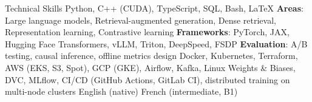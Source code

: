 
\begin{rubric}{Technical Skills}
	Python, C++ (CUDA), TypeScript, SQL, Bash, \LaTeX
{}
	\textbf{Areas}: Large language models, Retrieval-augmented generation, Dense retrieval, Representation learning, Contrastive learning \newline
	\textbf{Frameworks}: PyTorch, JAX, Hugging Face Transformers, vLLM, Triton, DeepSpeed, FSDP \newline
	\textbf{Evaluation}: A/B testing, causal inference, offline metrics design
	Docker, Kubernetes, Terraform, AWS (EKS, S3, Spot), GCP (GKE), Airflow, Kafka, Linux
	Weights \& Biases, DVC, MLflow, CI/CD (GitHub Actions, GitLab CI), distributed training on multi-node clusters
\entry*[Languages]
	English (native) \newline
	French (intermediate, B1)
\end{rubric}
